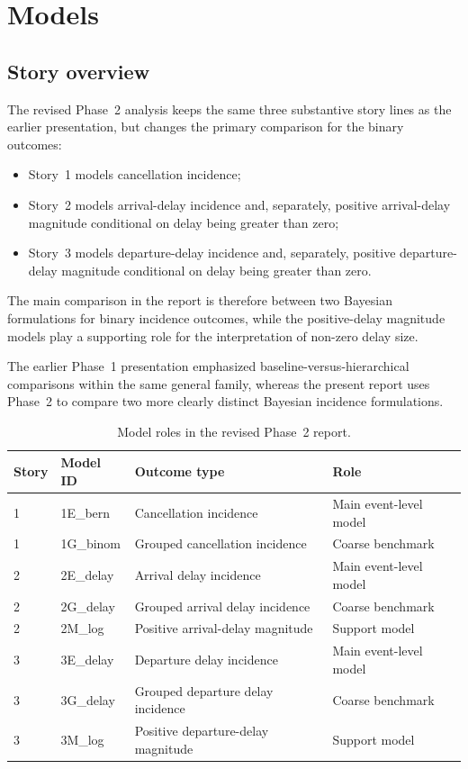 \documentclass[12pt]{article}
\begin{document}
\section{Models}
\subsection{Story overview}

The revised Phase~2 analysis keeps the same three substantive story lines as the earlier presentation, but changes the primary comparison for the binary outcomes:
\begin{itemize}
    \item Story~1 models cancellation incidence;
    \item Story~2 models arrival-delay incidence and, separately, positive arrival-delay magnitude conditional on delay being greater than zero;
    \item Story~3 models departure-delay incidence and, separately, positive departure-delay magnitude conditional on delay being greater than zero.
\end{itemize}

The main comparison in the report is therefore between two Bayesian formulations for binary incidence outcomes, while the positive-delay magnitude models play a supporting role for the interpretation of non-zero delay size.

The earlier Phase~1 presentation emphasized baseline-versus-hierarchical comparisons within the same general family, whereas the present report uses Phase~2 to compare two more clearly distinct Bayesian incidence formulations.

\begin{table}[t]
\centering
\caption{Model roles in the revised Phase~2 report.}
\label{tab:model_overview}
\begin{tabular}{llll}
\hline
Story & Model ID & Outcome type & Role \\
\hline
1 & 1E\_bern & Cancellation incidence & Main event-level model \\
1 & 1G\_binom & Grouped cancellation incidence & Coarse benchmark \\
2 & 2E\_delay & Arrival delay incidence & Main event-level model \\
2 & 2G\_delay & Grouped arrival delay incidence & Coarse benchmark \\
2 & 2M\_log & Positive arrival-delay magnitude & Support model \\
3 & 3E\_delay & Departure delay incidence & Main event-level model \\
3 & 3G\_delay & Grouped departure delay incidence & Coarse benchmark \\
3 & 3M\_log & Positive departure-delay magnitude & Support model \\
\hline
\end{tabular}
\end{table}
\end{document}
